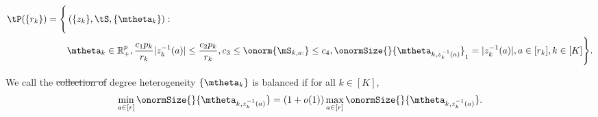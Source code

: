 \documentclass[lettersize,onecolumn,journal]{IEEEtran}
\theoremstyle{definition}
\theoremstyle{definition}
\newcommand{\of}[1]{\left(#1\right)}
\newcommand{\offf}[1]{\left\{#1\right\}}
\providecommand{\DIFdeltex}[1]{{\protect\color{red}\sout{#1}}}                      %
\providecommand{\DIFaddbegin}{} %
\providecommand{\DIFaddend}{} %
\providecommand{\DIFdelbegin}{} %
\providecommand{\DIFdelend}{} %
\providecommand{\DIFdel}[1]{\texorpdfstring{\DIFdeltex{#1}}{}} %
\newcommand{\DIFscaledelfig}{0.5}
\newlength{\DIFdelgraphicswidth} %
\newlength{\DIFdelgraphicsheight} %
\newcommand{\DIFaddincludegraphics}[2][]{{\color{blue}\fbox{\DIFOincludegraphics[#1]{#2}}}} %
\newcommand{\DIFdelincludegraphics}[2][]{%
\sbox{\DIFdelgraphicsbox}{\DIFOincludegraphics[#1]{#2}}%
\settoboxwidth{\DIFdelgraphicswidth}{\DIFdelgraphicsbox} %
\settoboxtotalheight{\DIFdelgraphicsheight}{\DIFdelgraphicsbox} %
\scalebox{\DIFscaledelfig}{%
\parbox[b]{\DIFdelgraphicswidth}{\usebox{\DIFdelgraphicsbox}\\[-\baselineskip] \rule{\DIFdelgraphicswidth}{0em}}\llap{\resizebox{\DIFdelgraphicswidth}{\DIFdelgraphicsheight}{%
\setlength{\unitlength}{\DIFdelgraphicswidth}%
\begin{picture}(1,1)%
\thicklines\linethickness{2pt} %
{\color[rgb]{1,0,0}\put(0,0){\framebox(1,1){}}}%
{\color[rgb]{1,0,0}\put(0,0){\line( 1,1){1}}}%
{\color[rgb]{1,0,0}\put(0,1){\line(1,-1){1}}}%
\end{picture}%
}\hspace*{3pt}}} %
} %
\DeclareRobustCommand{\DIFaddbegin}{\DIFOaddbegin \let\includegraphics\DIFaddincludegraphics} %
\DeclareRobustCommand{\DIFaddend}{\DIFOaddend \let\includegraphics\DIFOincludegraphics} %
\DeclareRobustCommand{\DIFdelbegin}{\DIFOdelbegin \let\includegraphics\DIFdelincludegraphics} %
\DeclareRobustCommand{\DIFdelend}{\DIFOaddend \let\includegraphics\DIFOincludegraphics} %
\begin{document}
\DIFdelbegin %
\DIFdelend \DIFaddbegin \begin{align}
 \tP(\{r_k\}) = \Bigg\{ &\of{\{z_k\}, \tS, \{\mtheta_k\}}:\\
   & \mtheta_k \in\mathbb{R}^p_{+}, {c_1 p_k\over r_k} |z_k^{-1}(a)| \leq {c_2 p_k\over r_k}, c_3 \leq  \onorm{\mS_{k,a:}} \leq c_4 ,\onormSize{}{\mtheta_{k,z_k^{-1}(a)}}_1=|z_k^{-1}(a)|, a \in [r_k], k\in[K]\Bigg\}. \label{eq:general_family}
\end{align}\DIFaddend 
\DIFdelbegin %
\DIFdelend 


We call the \DIFdelbegin \DIFdel{collection of }\DIFdelend degree heterogeneity $\{\mtheta_k\}$ is balanced if for all $k \in [K]$,
\begin{equation}\label{eq:general_balanced}
    {\min_{a\in[r]} \onormSize{}{\mtheta_{k, z_k^{-1}(a)}}=\left(1+o(1)\right)\max_{a\in[r]}\onormSize{}{\mtheta_{k,z_k^{-1}(a)}}}.
\end{equation}
\end{document}
